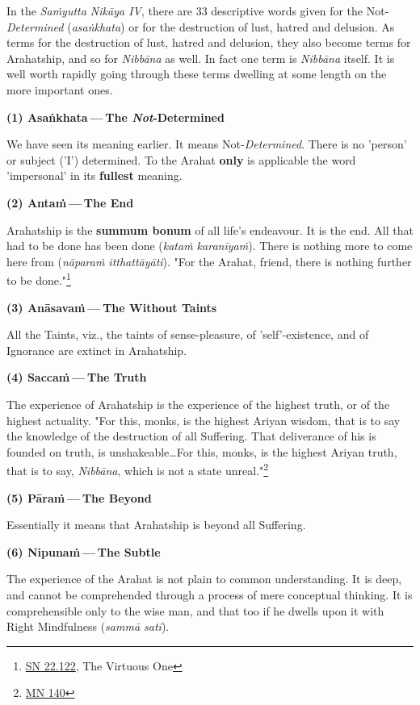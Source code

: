 In the \emph{Saṁyutta Nikāya IV}, there are 33 descriptive words given for the
Not-\emph{Determined} (\emph{asaṅkhata}) or for the destruction of lust,
hatred and delusion. As terms for the destruction of lust, hatred and
delusion, they also become terms for Arahatship, and so for \emph{Nibbāna} as
well. In fact one term is \emph{Nibbāna} itself. It is well worth rapidly
going through these terms dwelling at some length on the more important
ones.


\textbf{(1) Asaṅkhata — The \emph{Not}-Determined}


We have seen its meaning earlier. It means Not-\emph{Determined}. There is
no 'person' or subject ('I') determined. To the Arahat \textbf{only} is
applicable the word 'impersonal' in its \textbf{fullest} meaning.


\textbf{(2) Antaṁ — The End}


Arahatship is the \textbf{summum bonum} of all life’s endeavour. It is the end.
All that had to be done has been done (\emph{kataṁ karanīyaṁ}). There is
nothing more to come here from (\emph{nāparaṁ itthattāyāti}). "For the
Arahat, friend, there is nothing further to be done."\footnote{\href{https://suttacentral.net/sn22.122/en/suddhaso}{SN 22.122}, The Virtuous One}


\textbf{(3) Anāsavaṁ — The Without Taints}


All the Taints, viz., the taints of sense-pleasure, of
'self'-existence, and of Ignorance are extinct in Arahatship.


\textbf{(4) Saccaṁ — The Truth}


The experience of Arahatship is the experience of the highest truth, or
of the highest actuality. "For this, monks, is the highest Ariyan
wisdom, that is to say the knowledge of the destruction of all
Suffering. That deliverance of his is founded on truth, is
unshakeable…​ For this, monks, is the highest Ariyan truth, that is to
say, \emph{Nibbāna}, which is not a state unreal."\footnote{\href{https://suttacentral.net/mn140/en/bodhi}{MN 140}}


\textbf{(5) Pāraṁ — The Beyond}


\label{beyond}Essentially it means that Arahatship is beyond all Suffering.


\textbf{(6) Nipunaṁ — The Subtle}


The experience of the Arahat is not plain to common understanding. It is
deep, and cannot be comprehended through a process of mere conceptual
thinking. It is comprehensible only to the wise man, and that too if he
dwells upon it with Right Mindfulness (\emph{sammā sati}).


